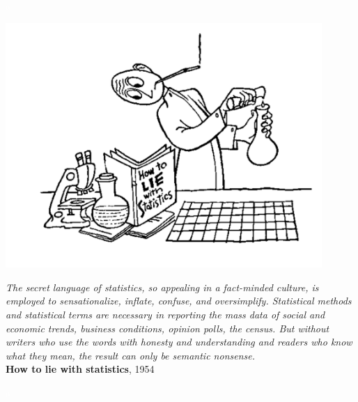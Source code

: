 
\newpage
\pagestyle{empty}
\pagecolor{white}
\textcolor{white}{a}


\newpage
\pagestyle{empty}
\pagecolor{white}
\vspace*{4cm}
\begin{center}
\includegraphics[width=120mm]{figures/howtoliewithstatistics}
\end{center}

\begin{flushright}
{\scriptsize {\it The secret language of statistics, so appealing in a fact-minded culture, is employed to sensationalize, inflate, confuse, and oversimplify. Statistical methods and statistical terms are necessary in reporting the mass data of social and economic trends, business conditions, opinion polls, the census. But without writers who use the words with honesty and understanding and readers who know what they mean, the result can only be semantic nonsense. }\\}
{\scriptsize {\bf How to lie with statistics}, 1954}
\end{flushright}


\newpage
\pagestyle{empty}
\pagecolor{white}
\textcolor{white}{a}


